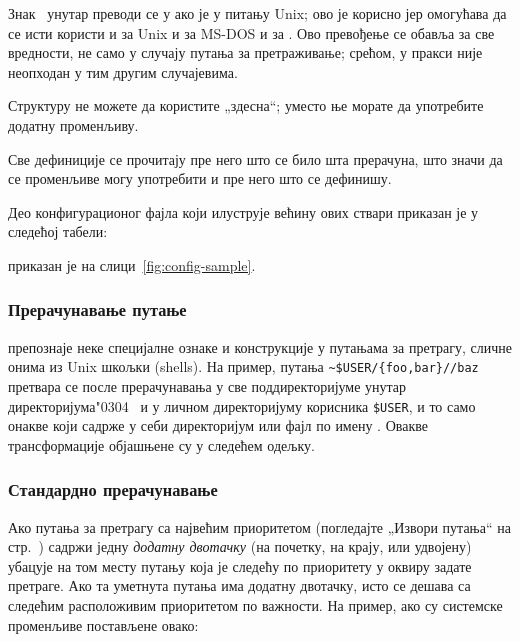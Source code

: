 \documentclass{article}
\begin{document}
\begin{itemize*}
  Знак \samp{;}\ унутар  преводи се у \samp{:} ако је 
  у питању Unix; ово је корисно јер омогућава да се исти 
   користи и за Unix и за MS-DOS и за \Windows{}.
  Ово превођење се обавља за све вредности, не само у случају путања
  за претраживање; срећом, у пракси \samp{;} није неопходан у тим 
  другим случајевима.

  Структуру  не можете да користите
  „здесна“; уместо ње морате да употребите додатну променљиву.

\item
  Све дефиниције се прочитају пре него што се било шта прерачуна, што
  значи да се променљиве могу употребити и пре него што се дефинишу.
\end{itemize*}
Део конфигурационог фајла који илуструје већину ових ствари
\ifSingleColumn
приказан је у следећој табели:


\else
приказан је на слици~\ref{fig:config-sample}.
\fi

\subsubsection{Прерачунавање путање}
\label{sec:path-expansion}

\KPS{} препознаје неке специјалне ознаке и конструкције у путањама за
претрагу, сличне онима из Unix шкољки (\textenglish{shells}). На
пример, путања \verb+~$USER/{foo,bar}//baz+ претвара се после
прерачунавања у све поддиректоријуме унутар директоријума\char"0304\
 и  у личном директоријуму корисника
\texttt{\$USER}, и то само онакве који садрже у себи директоријум или
фајл по имену \file{baz}. Овакве трансформације објашњене су у следећем
одељку.

\subsubsection{Стандардно прерачунавање}
\label{sec:default-expansion}

Ако путања за претрагу са највећим приоритетом (погледајте „Извори
путања“ на стр.~\pageref{sec:path-sources}) садржи једну
\emph{додатну двотачку} (на почетку, на крају, или удвојену) \KPS{}
убацује на том месту путању која је следећу по приоритету у оквиру
задате претраге. Ако та уметнута путања има додатну двотачку, исто се
дешава са следећим расположивим приоритетом по важности. На пример,
ако су системске променљиве постављене овако:
\end{document}
